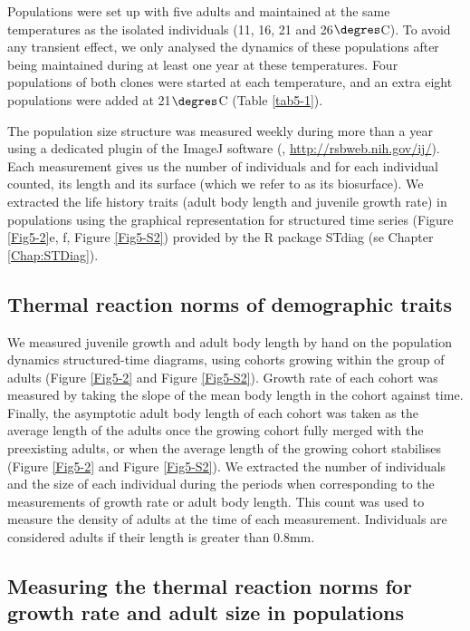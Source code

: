Populations were set up with five adults and maintained at the same temperatures
as the isolated individuals (11, 16, 21 and 26$\degres$C). To avoid any transient
effect, we only analysed the dynamics of these populations after being
maintained during at least one year at these temperatures. Four populations of
both clones were started at each temperature, and an extra eight populations
were added at 21$\degres$C (Table \ref{tab5-1}).

The population size structure was measured weekly during more than a year using
a dedicated plugin \autocites{mallard2012a,mallard2013a} of the ImageJ software
(\citealp{abramoff2004a}, \url{http://rsbweb.nih.gov/ij/}). Each
measurement gives us the number of individuals and for each individual counted, its length and its surface (which we refer to
as its biosurface). We extracted the life history traits (adult body length and
juvenile growth rate) in populations using the graphical representation for
structured time series (Figure \ref{Fig5-2}e, f, Figure \ref{Fig5-S2}) provided by the R
package STdiag (se  Chapter \ref{Chap:STDiag}).

\subsection{Thermal reaction norms of demographic traits}

We measured juvenile growth and adult body length by hand on the population
dynamics structured-time diagrams, using cohorts growing within the group of
adults (Figure \ref{Fig5-2} and Figure \ref{Fig5-S2}). Growth rate of each
cohort was measured by taking the slope of the mean body length in the cohort
against time. Finally, the asymptotic adult body length of each cohort was taken
as the average length of the adults once the growing cohort fully merged with
the preexisting adults, or when the average length of the growing cohort
stabilises (Figure \ref{Fig5-2} and Figure \ref{Fig5-S2}). We extracted the
number of individuals and the size of each individual during the periods when
corresponding to the measurements of growth rate or adult body length. This
count was used to measure the density of adults at the time of each measurement.
Individuals are considered adults if their length is greater than 0.8mm.

\subsection{Measuring the thermal reaction norms for growth rate and adult size
in populations}

